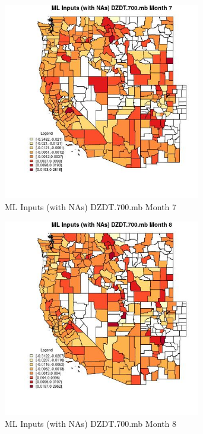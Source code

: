 \begin{figure} 
\centering  
\includegraphics[width=0.77\textwidth]{Code_Outputs/Report_ML_input_PM25_Step4_part_e_de_duplicated_aves_compiled_2019-05-21wNAs_CountyDZDT700mbmedianMonth7.jpg} 
\caption{\label{fig:Report_ML_input_PM25_Step4_part_e_de_duplicated_aves_compiled_2019-05-21wNAsCountyDZDT700mbmedianMonth7}ML Inputs (with NAs) DZDT.700.mb Month 7} 
\end{figure} 
 

\begin{figure} 
\centering  
\includegraphics[width=0.77\textwidth]{Code_Outputs/Report_ML_input_PM25_Step4_part_e_de_duplicated_aves_compiled_2019-05-21wNAs_CountyDZDT700mbmedianMonth8.jpg} 
\caption{\label{fig:Report_ML_input_PM25_Step4_part_e_de_duplicated_aves_compiled_2019-05-21wNAsCountyDZDT700mbmedianMonth8}ML Inputs (with NAs) DZDT.700.mb Month 8} 
\end{figure} 
 


